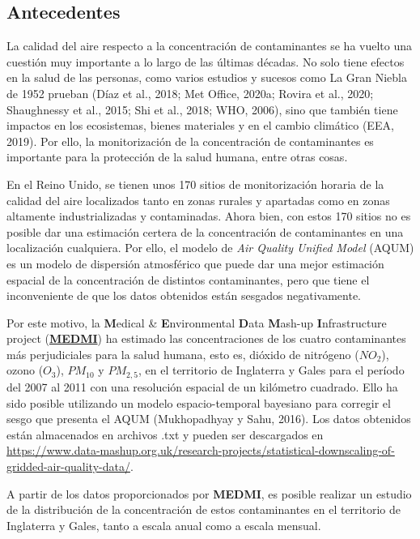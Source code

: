 \documentclass[12pt]{article}
\begin{document}
\normalsize

\subsection{Antecedentes}

La calidad del aire respecto a la concentración de contaminantes se ha vuelto una cuestión muy importante a lo largo de las últimas décadas. No solo tiene efectos en la salud de las personas, como varios estudios y sucesos como La Gran Niebla de 1952 prueban (Díaz et al., 2018; Met Office, 2020a; Rovira et al., 2020; Shaughnessy et al., 2015; Shi et al., 2018; WHO, 2006), sino que también tiene impactos en los ecosistemas, bienes materiales y en el cambio climático (EEA, 2019). Por ello, la monitorización de la concentración de contaminantes es importante para la protección de la salud humana, entre otras cosas.

En el Reino Unido, se tienen unos 170 sitios de monitorización horaria de la calidad del aire localizados tanto en zonas rurales y apartadas como en zonas altamente industrializadas y contaminadas. Ahora bien, con estos 170 sitios no es posible dar una estimación certera de la concentración de contaminantes en una localización cualquiera. Por ello, el modelo de \textit{Air Quality Unified Model} (AQUM) es un modelo de dispersión atmosférico que puede dar una mejor estimación espacial de la concentración de distintos contaminantes, pero que tiene el inconveniente de que los datos obtenidos están sesgados negativamente.

Por este motivo, la \textbf{M}edical \& \textbf{E}nvironmental \textbf{D}ata \textbf{M}ash-up \textbf{I}nfrastructure project (\href{https://www.data-mashup.org.uk/}{\textbf{MEDMI}}) ha estimado las concentraciones de los cuatro contaminantes más perjudiciales para la salud humana, esto es, dióxido de nitrógeno ($NO_{2}$), ozono ($O_{3}$), $PM_{10}$ y $PM_{2,5}$, en el territorio de Inglaterra y Gales para el período del 2007 al 2011 con una resolución espacial de un kilómetro cuadrado. Ello ha sido posible utilizando un modelo espacio-temporal bayesiano para corregir el sesgo que presenta el AQUM (Mukhopadhyay y Sahu, 2016). Los datos obtenidos están almacenados en archivos .txt y pueden ser descargados en \href{https://www.data-mashup.org.uk/research-projects/statistical-downscaling-of-gridded-air-quality-data/}{https://www.data-mashup.org.uk/research-projects/statistical-downscaling-of-gridded-air-quality-data/}.

A partir de los datos proporcionados por \textbf{MEDMI}, es posible realizar un estudio de la distribución de la concentración de estos contaminantes en el territorio de Inglaterra y Gales, tanto a escala anual como a escala mensual.
\end{document}
